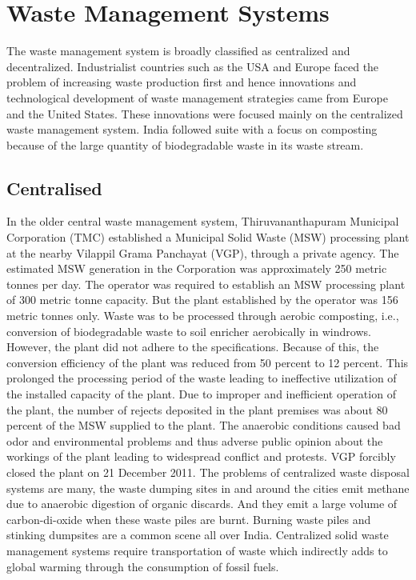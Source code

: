 \documentclass[12pt,a4paper]{report}
\begin{document}
\chapter{\textbf{Waste Management Systems}}
\begin{justify}
	The waste management system is broadly classified as centralized and decentralized. Industrialist countries such as the USA and Europe faced the problem of increasing waste production first and hence innovations and technological development of waste management strategies came from Europe and the United States. These innovations were focused mainly on the centralized waste management system. India followed suite with a focus on composting because of the large quantity of biodegradable waste in its waste stream.
\end{justify}
\section{Centralised}
\begin{justify}
	In the older central waste management system, Thiruvananthapuram Municipal Corporation (TMC) established a Municipal Solid Waste (MSW) processing plant at the nearby Vilappil Grama Panchayat (VGP), through a private agency. The estimated MSW generation in the Corporation was approximately 250 metric tonnes per day. The operator was required to establish an MSW processing plant of 300 metric tonne capacity. But the plant established by the operator was 156 metric tonnes only. Waste was to be processed through aerobic composting, i.e., conversion of biodegradable waste to soil enricher aerobically in windrows. However, the plant did not adhere to the specifications. Because of this, the conversion efficiency of the plant was reduced from 50 percent to 12 percent. This prolonged the processing period of the waste leading to ineffective utilization of the installed capacity of the plant. Due to improper and inefficient operation of the plant, the number of rejects deposited in the plant premises was about 80 percent of the MSW supplied to the plant. The anaerobic conditions caused bad odor and environmental problems and thus adverse public opinion about the workings of the plant leading to widespread conflict and protests. VGP forcibly closed the plant on 21 December 2011.
	The problems of centralized waste disposal systems are many, the waste dumping sites in and around the cities emit methane due to anaerobic digestion of organic discards. And they emit a large volume of carbon-di-oxide when these waste piles are burnt. Burning waste piles and stinking dumpsites are a common scene all over India. Centralized solid waste management systems require transportation of waste which indirectly adds to global warming through the consumption of fossil fuels.
	
\end{justify}
\end{document}
